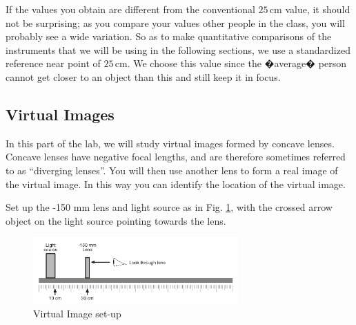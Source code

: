 If the values you obtain are different from the conventional $25\, \textrm{cm}$ value, it should not be surprising; as you compare your values other people in the class, you will probably see a wide variation. So as to make quantitative comparisons of the instruments that we will be using in the following sections, we use a standardized reference near point of $25\, \textrm{cm}$. We choose this value since the �average� person cannot get closer to an object than this and still keep it in focus.

\subsection{Virtual Images}

In this part of the lab, we will study virtual images formed by concave lenses. Concave lenses have negative focal lengths, and are therefore sometimes referred to as ``diverging lenses''. You will then use
another lens to form a real image of the virtual image. In this way you can identify the
location of the virtual image.\myskip

Set up the -150 mm lens and light source as in Fig. \ref{virt1}, with the crossed arrow object on the light source pointing towards the lens.\myskip

\begin{figure}[h]
\centering
\includegraphics[width=0.7\textwidth]{./Exp7/pic/virtual-1.png}
\caption{Virtual Image set-up}
\label{virt1}
\end{figure}

